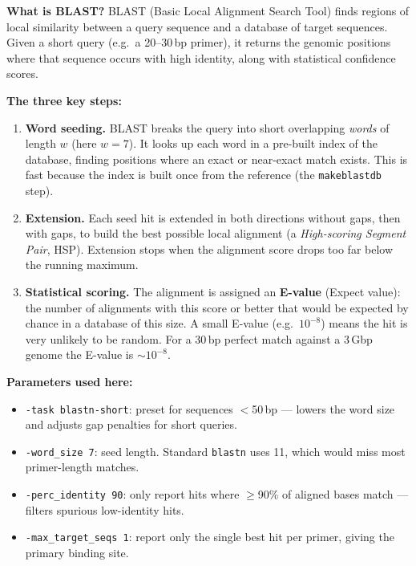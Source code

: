 \begin{tcolorbox}[
  title={\textbf{Box 2: How BLAST works}},
  colback=orange!3!white, colframe=orange!50!black,
  fonttitle=\small\bfseries,
  left=6pt, right=6pt, top=4pt, bottom=4pt
]

\textbf{What is BLAST?}
BLAST (Basic Local Alignment Search Tool) finds regions of local similarity between
a query sequence and a database of target sequences. Given a short query (e.g.\ a
20--30\,bp primer), it returns the genomic positions where that sequence occurs with
high identity, along with statistical confidence scores.

\medskip
\textbf{The three key steps:}

\begin{enumerate}
  \item \textbf{Word seeding.} BLAST breaks the query into short overlapping
    \emph{words} of length $w$ (here $w=7$). It looks up each word in a pre-built
    index of the database, finding positions where an exact or near-exact match
    exists. This is fast because the index is built once from the reference (the
    \texttt{makeblastdb} step).

  \item \textbf{Extension.} Each seed hit is extended in both directions without
    gaps, then with gaps, to build the best possible local alignment (a
    \emph{High-scoring Segment Pair}, HSP). Extension stops when the alignment
    score drops too far below the running maximum.

  \item \textbf{Statistical scoring.} The alignment is assigned an
    \textbf{E-value} (Expect value): the number of alignments with this score or
    better that would be expected by chance in a database of this size. A small
    E-value (e.g.\ $10^{-8}$) means the hit is very unlikely to be random.
    For a 30\,bp perfect match against a 3\,Gbp genome the E-value is $\sim\!10^{-8}$.
\end{enumerate}

\medskip
\textbf{Parameters used here:}
\begin{itemize}
  \item \texttt{-task blastn-short}: preset for sequences $<$50\,bp --- lowers the
    word size and adjusts gap penalties for short queries.
  \item \texttt{-word\_size 7}: seed length. Standard \texttt{blastn} uses 11,
    which would miss most primer-length matches.
  \item \texttt{-perc\_identity 90}: only report hits where $\geq$90\% of aligned
    bases match --- filters spurious low-identity hits.
  \item \texttt{-max\_target\_seqs 1}: report only the single best hit per primer,
    giving the primary binding site.
\end{itemize}


\end{tcolorbox}
